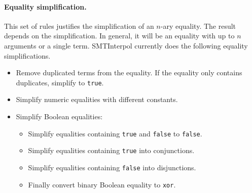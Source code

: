 \documentclass[a4paper]{article}
\newcommand\si{SMTInterpol\xspace}
\begin{document}
\paragraph{Equality simplification.}
This set of rules justifies the simplification of an $n$-ary equality.  The
result depends on the simplification.  In general, it will be an equality with
up to $n$ arguments or a single term.  \si currently does the following
equality simplifications.
\begin{itemize}
\item Remove duplicated terms from the equality.  If the equality only
  contains duplicates, simplify to \verb+true+.
\item Simplify numeric equalities with different constants.
\item Simplify Boolean equalities:
  \begin{itemize}
  \item Simplify equalities containing \verb+true+ and \verb+false+ to
    \verb+false+.
  \item Simplify equalities containing \verb+true+ into conjunctions.
  \item Simplify equalities containing \verb+false+ into disjunctions.
  \item Finally convert binary Boolean equality to \verb+xor+.
  \end{itemize}
\end{itemize}
\end{document}
